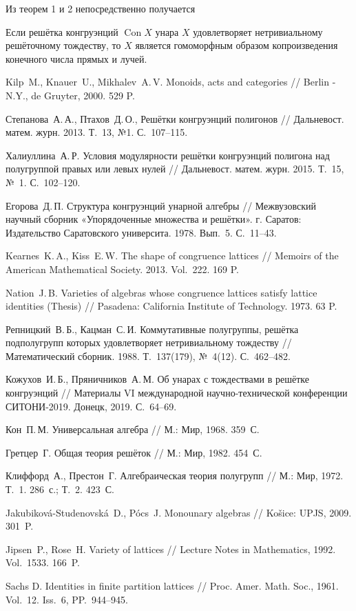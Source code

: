 \documentclass[11pt,twoside,final
]{article}
\def\Con{\operatorname{Con}}
\begin{document}
Из теорем 1 и 2 непосредственно получается
\begin{corollary}
	Если решётка конгруэнций $\Con X$ унара $X$ удовлетворяет нетривиальному решёточному тождеству, то $X$ является гомоморфным образом копроизведения конечного числа прямых и лучей.
\end{corollary}

\begin{thebibliography}{99}

	Kilp~M., Knauer~U., Mikhalev~A.\,V. Monoids, acts and categories // Berlin - N.Y., de Gruyter, 2000. 529 P.

	Степанова~А.\,А., Птахов~Д.\,О.,  Решётки конгруэнций полигонов // Дальневост. матем. журн. 2013. Т.~13, №1. С.~107--115.

	Халиуллина~А.\,Р. Условия модулярности решётки конгруэнций полигона над полугруппой правых или левых нулей // Дальневост. матем. журн. 2015. Т.~15, №~1. С.~102--120.

	Егорова~Д.\,П. Структура конгруэнций унарной алгебры // Межвузовский научный сборник «Упорядоченные множества и решётки». г. Саратов: Издательство Саратовского университа. 1978. Вып.~5. С.~11--43.

	Kearnes~K.\,A., Kiss~E.\,W. The shape of congruence lattices // Memoirs of the American Mathematical Society. 2013. Vol.~222. 169 P.

	Nation~J.\,B. Varieties of algebras whose congruence lattices satisfy lattice identities (Thesis) // Pasadena: California Institute of Technology. 1973. 63 P.

	Репницкий~В.\,Б., Кацман~С.\,И. Коммутативные полугруппы, решётка подполугрупп которых удовлетворяет нетривиальному тождеству // Математический сборник. 1988. Т.~137(179), №~4(12). С.~462--482.

	Кожухов~И.\,Б., Пряничников~А.\,М. Об унарах с тождествами в решётке конгруэнций // Материалы VI международной научно-технической конференции СИТОНИ-2019. Донецк, 2019. С.~64--69.

	Кон~П.\,М. Универсальная алгебра // М.: Мир, 1968. 359~С.

	Гретцер~Г. Общая теория решёток // М.: Мир, 1982. 454~С.

	Клиффорд~А., Престон~Г. Алгебраическая теория полугрупп // М.: Мир, 1972. Т.~1. 286~с.; Т.~2. 423~С.

	Jakubiková-Studenovská~D., Pócs~J. Monounary algebras // Košice: UPJS, 2009. 301~P.

	Jipsen~P., Rose~H. Variety of lattices // Lecture Notes in Mathematics, 1992. Vol.~1533. 166~P.

	Sachs D. Identities in finite partition lattices // Proc. Amer. Math. Soc., 1961. Vol.~12. Iss.~6, PP.~944--945.

\end{thebibliography}
\end{document}

